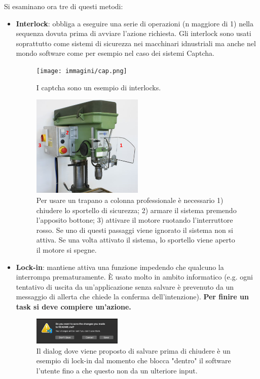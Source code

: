 Si esaminano ora tre di questi metodi:
\begin{itemize}
	\item \textbf{Interlock}: obbliga a eseguire una serie di operazioni (n maggiore di 1) nella sequenza dovuta prima di avviare l'azione richiesta. Gli interlock sono usati soprattutto come sistemi di sicurezza nei macchinari idnustriali ma anche nel mondo software come per esempio nel caso dei sistemi Captcha.
	
	\begin{figure}[!h]
	\centering
	\texttt{[image: immagini/cap.png]}
	\caption{I captcha sono un esempio di interlocks.}
\end{figure}

\begin{figure}[!h]
	\centering
	\includegraphics[width=0.5\textwidth]{src/immagini/trapano.png}
	\caption{Per usare un trapano a colonna professionale è necessario 1) chiudere lo sportello di sicurezza; 2) armare il sistema premendo l'apposito bottone; 3) attivare il motore ruotando l'interruttore rosso. Se uno di questi passaggi viene ignorato il sistema non si attiva. Se una volta attivato il sistema, lo sportello viene aperto il motore si spegne. }
\end{figure}

	\item \textbf{Lock-in}: mantiene attiva una funzione impedendo che qualcuno la interrompa prematuramente. È usato molto in ambito informatico (e.g. ogni tentativo di uscita da un'applicazione senza salvare è prevenuto da un messaggio di allerta che chiede la conferma dell'intenzione). \textbf{Per finire un task si deve compiere un'azione.}
	
	\begin{figure}[!h]
	\centering
	\includegraphics[width=0.4\textwidth]{src/immagini/savedialog.png}
	\caption{Il dialog dove viene proposto di salvare prima di chiudere è un esempio di lock-in dal momento che blocca "dentro" il software l'utente fino a che questo non da un ulteriore input.}
\end{figure}



\end{itemize}

